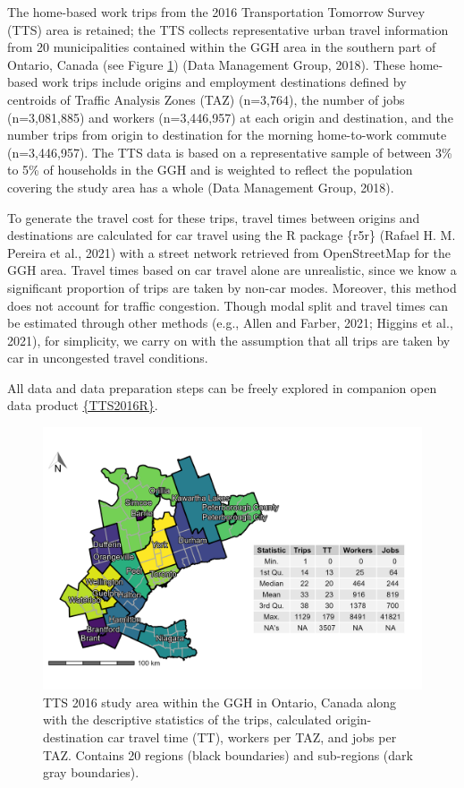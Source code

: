 \documentclass[]{elsarticle} %
\begin{document}
The home-based work trips from the 2016 Transportation Tomorrow Survey
(TTS) area is retained; the TTS collects representative urban travel
information from 20 municipalities contained within the GGH area in the
southern part of Ontario, Canada (see Figure
\ref{fig:TTS-16-survey-area}) (Data Management Group, 2018). These
home-based work trips include origins and employment destinations
defined by centroids of Traffic Analysis Zones (TAZ) (n=3,764), the
number of jobs (n=3,081,885) and workers (n=3,446,957) at each origin
and destination, and the number trips from origin to destination for the
morning home-to-work commute (n=3,446,957). The TTS data is based on a
representative sample of between 3\% to 5\% of households in the GGH and
is weighted to reflect the population covering the study area has a
whole (Data Management Group, 2018).

To generate the travel cost for these trips, travel times between
origins and destinations are calculated for car travel using the R
package \{r5r\} (Rafael H. M. Pereira et al., 2021) with a street
network retrieved from OpenStreetMap for the GGH area. Travel times
based on car travel alone are unrealistic, since we know a significant
proportion of trips are taken by non-car modes. Moreover, this method
does not account for traffic congestion. Though modal split and travel
times can be estimated through other methods (e.g., Allen and Farber,
2021; Higgins et al., 2021), for simplicity, we carry on with the
assumption that all trips are taken by car in uncongested travel
conditions.

All data and data preparation steps can be freely explored in companion
open data product
\href{https://github.com/soukhova/TTS2016R}{\{TTS2016R\}}.

\begin{figure}

{\centering \includegraphics[width=0.8\linewidth]{images/TTS16-survey-area} 

}

\caption{\label{fig:TTS-16-survey-area}TTS 2016 study area within the GGH in Ontario, Canada along with the descriptive statistics of the trips, calculated origin-destination car travel time (TT), workers per TAZ, and jobs per TAZ. Contains 20 regions (black boundaries) and sub-regions (dark gray boundaries).}\label{fig:TTS-16-survey-area}
\end{figure}
\end{document}
